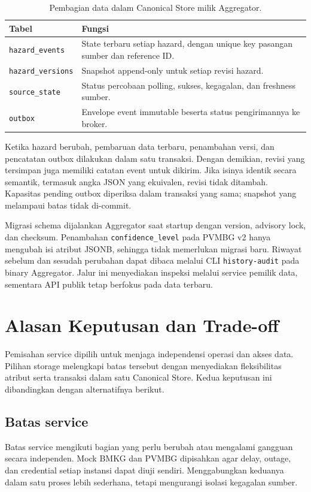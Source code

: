\begin{table}[H]
\centering\small
\begin{tabularx}{\textwidth}{>{\raggedright\arraybackslash}p{4cm}Y}
\toprule
Tabel & Fungsi \\
\midrule
\texttt{hazard\_events} & State terbaru setiap hazard, dengan unique key pasangan sumber dan reference ID. \\
\texttt{hazard\_versions} & Snapshot append-only untuk setiap revisi hazard. \\
\texttt{source\_state} & Status percobaan polling, sukses, kegagalan, dan freshness sumber. \\
\texttt{outbox} & Envelope event immutable beserta status pengirimannya ke broker. \\
\bottomrule
\end{tabularx}
\caption{Pembagian data dalam Canonical Store milik Aggregator.}
\label{tab:canonical-tables}
\end{table}

Ketika hazard berubah, pembaruan data terbaru, penambahan versi, dan pencatatan outbox dilakukan dalam satu transaksi. Dengan demikian, revisi yang tersimpan juga memiliki catatan event untuk dikirim. Jika isinya identik secara semantik, termasuk angka JSON yang ekuivalen, revisi tidak ditambah. Kapasitas pending outbox diperiksa dalam transaksi yang sama; snapshot yang melampaui batas tidak di-commit.

Migrasi schema dijalankan Aggregator saat startup dengan version, advisory lock, dan checksum. Penambahan \texttt{confidence\_level} pada PVMBG v2 hanya mengubah isi atribut JSONB, sehingga tidak memerlukan migrasi baru. Riwayat sebelum dan sesudah perubahan dapat dibaca melalui CLI \texttt{history-audit} pada binary Aggregator. Jalur ini menyediakan inspeksi melalui service pemilik data, sementara API publik tetap berfokus pada data terbaru.

\section{Alasan Keputusan dan Trade-off}
Pemisahan service dipilih untuk menjaga independensi operasi dan akses data. Pilihan storage melengkapi batas tersebut dengan menyediakan fleksibilitas atribut serta transaksi dalam satu Canonical Store. Kedua keputusan ini dibandingkan dengan alternatifnya berikut.

\subsection{Batas service}
Batas service mengikuti bagian yang perlu berubah atau mengalami gangguan secara independen. Mock BMKG dan PVMBG dipisahkan agar delay, outage, dan credential setiap instansi dapat diuji sendiri. Menggabungkan keduanya dalam satu proses lebih sederhana, tetapi mengurangi isolasi kegagalan sumber.

